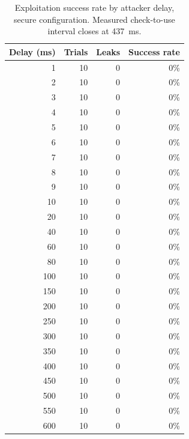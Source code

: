 \begin{table}[ht]
\centering
\begin{tabular}{rrrr}
\hline
Delay (ms) & Trials & Leaks & Success rate \\
\hline
1 & 10 & 0 & 0\% \\
2 & 10 & 0 & 0\% \\
3 & 10 & 0 & 0\% \\
4 & 10 & 0 & 0\% \\
5 & 10 & 0 & 0\% \\
6 & 10 & 0 & 0\% \\
7 & 10 & 0 & 0\% \\
8 & 10 & 0 & 0\% \\
9 & 10 & 0 & 0\% \\
10 & 10 & 0 & 0\% \\
20 & 10 & 0 & 0\% \\
40 & 10 & 0 & 0\% \\
60 & 10 & 0 & 0\% \\
80 & 10 & 0 & 0\% \\
100 & 10 & 0 & 0\% \\
150 & 10 & 0 & 0\% \\
200 & 10 & 0 & 0\% \\
250 & 10 & 0 & 0\% \\
300 & 10 & 0 & 0\% \\
350 & 10 & 0 & 0\% \\
400 & 10 & 0 & 0\% \\
450 & 10 & 0 & 0\% \\
500 & 10 & 0 & 0\% \\
550 & 10 & 0 & 0\% \\
600 & 10 & 0 & 0\% \\
\hline
\end{tabular}
\caption{Exploitation success rate by attacker delay, secure configuration. Measured check-to-use interval closes at 437~ms.}
\label{tab:success-secure}
\end{table}
